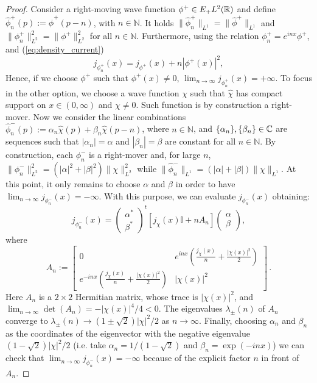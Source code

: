 \begin{proof}
	Consider a right-moving wave function $\phi^+\in E_+L^2({\mathbb R})$ and define $\hat{\phi}_n^+(p):=\hat{\phi}^+(p-n)$, with $n\in\mathbb{N}$. It holds $\|\hat{\phi}_n^+\|_{L^1}= \|\hat{\phi}^+\|_{L^1}$ and $\|\phi_n^+\|_{L^2}^2=\|\phi^+\|_{L^2}^2$ for all $n\in\mathbb{N}$. Furthermore, using the relation $\phi_n^+=e^{inx}\phi^+$, and (\ref{eq:density_current})
	\begin{equation}
	j_{\phi_n^+}(x)=j_{\phi^+}(x)+n|\phi^+(x)|^2,
	\end{equation}
	Hence, if we choose $\phi^+$ such that $\phi^+(x)\neq0$, $\lim_{n\to\infty}j_{\phi_n^+}(x)=+\infty$. To focus in the other option, we choose a wave function $\chi$ such that $\hat{\chi}$ has compact support on $x\in(0,\infty)$ and $\chi\neq0$. Such function is by construction a right-mover. Now we consider the linear combinations $\hat{\phi}_n^-(p):=\alpha_n\hat{\chi}(p)+\beta_n\hat{\chi}(p-n)$, where $n\in\mathbb{N}$, and $\{\alpha_n\},\{\beta_n\}\in{\mathbb C}$ are sequences such that $|\alpha_n|=\alpha$ and $|\beta_n|=\beta$ are constant for all $n\in\mathbb{N}$. By construction, each $\phi_n^-$ is a right-mover and, for large $n$, $\|\phi_n^-\|_{L^2}^2=(|\alpha|^2+|\beta|^2)\|\chi\|_{L^2}^2$ while $\|\hat{\phi}_n^-\|_{L^1}=(|\alpha|+|\beta|)\|\chi\|_{L^1}$. At this point, it only remains to choose $\alpha$ and $\beta$ in order to have $\lim_{n\to\infty}j_{\phi_n^-}(x)=-\infty$. With this purpose, we can evaluate $j_{\phi_n^-}(x)$ obtaining:
	\begin{equation}
	j_{\phi_n^-}(x)=\begin{pmatrix}\alpha^*\\ \beta^* \end{pmatrix}^t[j_\chi(x)\mathbb{I}+nA_n]\begin{pmatrix}\alpha \\ \beta	\end{pmatrix},
	\end{equation}
	where
	\begin{equation}
	A_n:=\begin{bmatrix}
	0 & e^{inx}\left(\frac{j_\chi(x)}{n}+\frac{|\chi(x)|^2}{2}\right)\\
	e^{-inx}\left(\frac{j_\chi(x)}{n}+\frac{|\chi(x)|^2}{2}\right) & |\chi(x)|^2
	\end{bmatrix}\, .
	\end{equation}
	Here $A_n$ is a $2\times2$ Hermitian matrix, whose trace is $|\chi(x)|^2$, and $\lim_{n\to\infty}\det(A_n)=-|\chi(x)|^4/4<0$. The eigenvalues $\lambda_\pm(n)$ of $A_n$ converge to $\lambda_\pm(n)\to (1\pm\sqrt{2})|\chi|^2/2$ as $n\to\infty$. Finally, choosing $\alpha_n$ and $\beta_n$ as the coordinates of the eigenvector with the negative eigenvalue $(1-\sqrt{2})|\chi|^2/2$ (i.e. take $\alpha_n=1/(1-\sqrt{2})$ and $\beta_n=\exp(-inx)$) we can  check that $\lim_{n\to\infty}j_{\phi_n^-}(x)=-\infty$ because of the explicit factor $n$ in front of $A_n$.
\end{proof}

